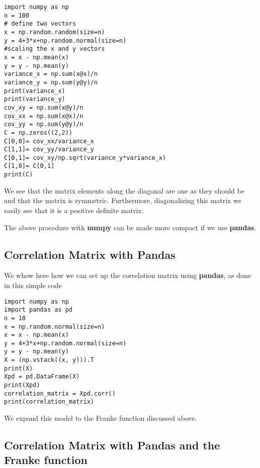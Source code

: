 \documentclass[%
oneside,                 %
final,                   %
10pt]{article}
\begin{document}
\begin{verbatim}
import numpy as np
n = 100
# define two vectors                                                                                           
x = np.random.random(size=n)
y = 4+3*x+np.random.normal(size=n)
#scaling the x and y vectors                                                                                   
x = x - np.mean(x)
y = y - np.mean(y)
variance_x = np.sum(x@x)/n
variance_y = np.sum(y@y)/n
print(variance_x)
print(variance_y)
cov_xy = np.sum(x@y)/n
cov_xx = np.sum(x@x)/n
cov_yy = np.sum(y@y)/n
C = np.zeros((2,2))
C[0,0]= cov_xx/variance_x
C[1,1]= cov_yy/variance_y
C[0,1]= cov_xy/np.sqrt(variance_y*variance_x)
C[1,0]= C[0,1]
print(C)
\end{verbatim}

We see that the matrix elements along the diagonal are one as they
should be and that the matrix is symmetric. Furthermore, diagonalizing
this matrix we easily see that it is a positive definite matrix.

The above procedure with \textbf{numpy} can be made more compact if we use \textbf{pandas}.

\subsection*{Correlation Matrix with Pandas}

We whow here how we can set up the correlation matrix using \textbf{pandas}, as done in this simple code
\begin{verbatim}
import numpy as np
import pandas as pd
n = 10
x = np.random.normal(size=n)
x = x - np.mean(x)
y = 4+3*x+np.random.normal(size=n)
y = y - np.mean(y)
X = (np.vstack((x, y))).T
print(X)
Xpd = pd.DataFrame(X)
print(Xpd)
correlation_matrix = Xpd.corr()
print(correlation_matrix)
\end{verbatim}


We expand this model to the Franke function discussed above.

\subsection*{Correlation Matrix with Pandas and the Franke function}
\end{document}
